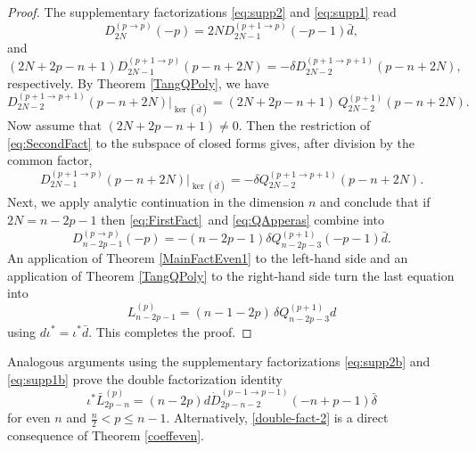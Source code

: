\documentclass[a4paper,12pt,reqno]{amsart}
\numberwithin{theorem}{subsection}
\numberwithin{equation}{section}
\begin{document}
\begin{proof} The supplementary factorizations \eqref{eq:supp2} and \eqref{eq:supp1}
read
\begin{equation}\label{eq:FirstFact}
   D_{2N}^{(p\to p)}(-p) = 2N D_{2N-1}^{(p+1\to p)}(-p-1) \bar{d},
\end{equation}
and
\begin{equation}\label{eq:SecondFact}
   (2N\!+\!2p\!-\!n\!+1)D_{2N-1}^{(p+1\to p)}(p\!-\!n\!+\!2N)
   = -\delta D_{2N-2}^{(p+1\to p+1)}(p\!-\!n\!+\!2N),
\end{equation}
respectively. By Theorem \ref{TangQPoly}, we have
\begin{equation*}
   D_{2N-2}^{(p+1\to p+1)}(p\!-\!n\!+\!2N)|_{\ker(\bar{d})}
   = (2N\!+\!2p\!-\!n\!+\!1) \, Q_{2N-2}^{(p+1)}(p\!-\!n\!+\!2N).
\end{equation*}
Now assume that $(2N+2p-n+1) \ne 0$. Then the restriction of
\eqref{eq:SecondFact} to the subspace of closed forms gives, after division by
the common factor,
\begin{equation}\label{eq:QApperas}
   D_{2N-1}^{(p+1\to p)}(p\!-\!n\!+\!2N)|_{\ker(\bar{d})}
   = -\delta Q_{2N-2}^{(p+1\to p+1)}(p\!-\!n\!+\!2N).
\end{equation}
Next, we apply analytic continuation in the dimension $n$ and conclude that if
$2N=n-2p-1$ then \eqref{eq:FirstFact}\ and \eqref{eq:QApperas} combine into
\begin{equation*}
   D_{n-2p-1}^{(p\to p)}(-p) = -(n\!-\!2p\!-\!1) \delta Q_{n-2p-3}^{(p+1)}(-p-1) \bar{d}.
\end{equation*}
An application of Theorem \ref{MainFactEven1} to the left-hand side and an
application of Theorem \ref{TangQPoly} to the right-hand side turn the last
equation into
\begin{equation*}
   L_{n-2p-1}^{(p)} = (n\!-\!1\!-\!2p)\, \delta Q_{n-2p-3}^{(p+1)} {d}
\end{equation*}
using ${d} \iota^* = \iota^* \bar{d}$. This completes the proof.
\end{proof}

Analogous arguments using the supplementary factorizations \eqref{eq:supp2b}
and \eqref{eq:supp1b} prove the double factorization identity
\begin{equation}\label{double-fact-2}
   \iota^* \bar{L}^{(p)}_{2p-n} = (n\!-\!2p) d \dot{D}_{2p-n-2}^{(p-1 \to
   p-1)}(-n\!+\!p\!-\!1) \bar{\delta}
\end{equation}
for even $n$ and $\frac{n}{2} < p \le n-1$. Alternatively,
\eqref{double-fact-2} is a direct consequence of Theorem \ref{coeffeven}.
\end{document}
